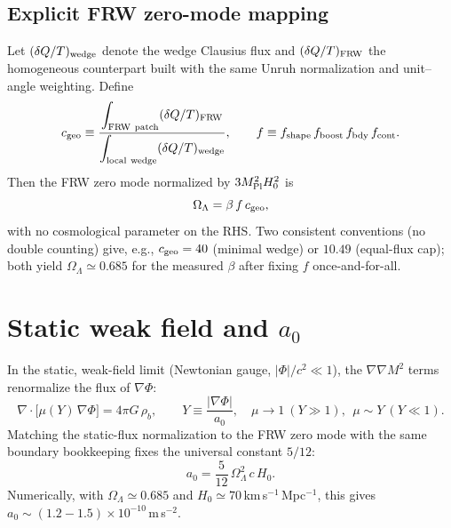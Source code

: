 \documentclass[aps,prd,preprint,onecolumn,longbibliography,nofootinbib]{revtex4-2}
\theoremstyle{plain}
\theoremstyle{remark}
\newcommand{\OmL}{\Omega_\Lambda}
\newcommand{\Hzero}{H_0}
\newcommand{\be}{\beta}
\newcommand{\Mpl}{M_{\rm Pl}}
\begin{document}
\subsection{Explicit FRW zero-mode mapping}
Let $(\delta Q/T)_{\rm wedge}$ denote the wedge Clausius flux and $(\delta Q/T)_{\rm FRW}$ the homogeneous counterpart built with the same Unruh normalization and unit–angle weighting. Define
\begin{equation}
c_{\rm geo}\equiv \frac{\displaystyle\int_{\rm FRW\ patch}(\delta Q/T)_{\rm FRW}}
{\displaystyle\int_{\rm local\ wedge}(\delta Q/T)_{\rm wedge}},\qquad
f\equiv f_{\rm shape}\,f_{\rm boost}\,f_{\rm bdy}\,f_{\rm cont}.
\end{equation}
Then the FRW zero mode normalized by $3\Mpl^2\Hzero^2$ is
\begin{equation}
\OmL=\be\,f\,c_{\rm geo},
\end{equation}
with no cosmological parameter on the RHS. Two consistent conventions (no double counting) give, e.g., $c_{\rm geo}=40$ (minimal wedge) or $10.49$ (equal-flux cap); both yield $\OmL\simeq 0.685$ for the measured $\be$ after fixing $f$ once-and-for-all.

\section{Static weak field and \texorpdfstring{$a_0$}{a0}}
In the static, weak-field limit (Newtonian gauge, $|\Phi|/c^2\ll 1$), the $\nabla\nabla M^2$ terms renormalize the flux of $\nabla\Phi$:
\begin{equation}
\nabla\!\cdot\!\Big[\mu(Y)\,\nabla\Phi\Big]=4\pi G\,\rho_b,\qquad Y\equiv \frac{|\nabla\Phi|}{a_0},\quad 
\mu\!\to\!1\ (Y\!\gg\!1),\ \ \mu\!\sim\!Y\ (Y\!\ll\!1).
\end{equation}
Matching the static-flux normalization to the FRW zero mode with the same boundary bookkeeping fixes the universal constant $5/12$:
\begin{equation}
a_0=\frac{5}{12}\,\OmL^2\,c\,\Hzero.
\end{equation}
Numerically, with $\OmL\simeq 0.685$ and $\Hzero\simeq 70$\,km\,s$^{-1}$\,Mpc$^{-1}$, this gives $a_0\sim (1.2\!-\!1.5)\!\times\!10^{-10}\,$m\,s$^{-2}$.
\end{document}
